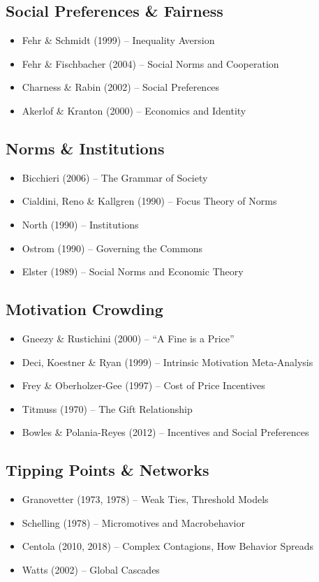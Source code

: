 \subsection{Social Preferences \& Fairness}
\begin{itemize}
\item Fehr \& Schmidt (1999) -- Inequality Aversion
\item Fehr \& Fischbacher (2004) -- Social Norms and Cooperation
\item Charness \& Rabin (2002) -- Social Preferences
\item Akerlof \& Kranton (2000) -- Economics and Identity
\end{itemize}

\subsection{Norms \& Institutions}
\begin{itemize}
\item Bicchieri (2006) -- The Grammar of Society
\item Cialdini, Reno \& Kallgren (1990) -- Focus Theory of Norms
\item North (1990) -- Institutions
\item Ostrom (1990) -- Governing the Commons
\item Elster (1989) -- Social Norms and Economic Theory
\end{itemize}

\subsection{Motivation Crowding}
\begin{itemize}
\item Gneezy \& Rustichini (2000) -- ``A Fine is a Price''
\item Deci, Koestner \& Ryan (1999) -- Intrinsic Motivation Meta-Analysis
\item Frey \& Oberholzer-Gee (1997) -- Cost of Price Incentives
\item Titmuss (1970) -- The Gift Relationship
\item Bowles \& Polania-Reyes (2012) -- Incentives and Social Preferences
\end{itemize}

\subsection{Tipping Points \& Networks}
\begin{itemize}
\item Granovetter (1973, 1978) -- Weak Ties, Threshold Models
\item Schelling (1978) -- Micromotives and Macrobehavior
\item Centola (2010, 2018) -- Complex Contagions, How Behavior Spreads
\item Watts (2002) -- Global Cascades
\end{itemize}

